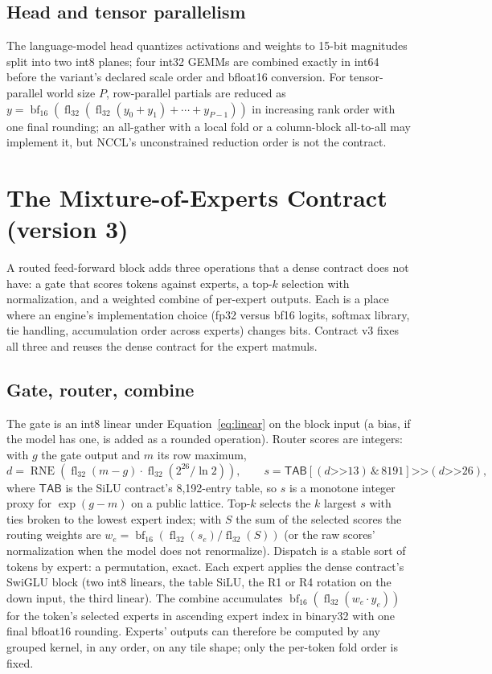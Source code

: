 \documentclass{article}
\newcommand{\fl}{\operatorname{fl}_{32}}
\newcommand{\bfround}{\operatorname{bf}_{16}}
\newcommand{\rne}{\operatorname{RNE}}
\begin{document}
\subsection{Head and tensor parallelism}

The language-model head quantizes activations and weights to 15-bit magnitudes split into two
int8 planes; four int32 GEMMs are combined exactly in int64 before the variant's declared
scale order and bfloat16 conversion.  For tensor-parallel world size $P$, row-parallel
partials are reduced as $y=\bfround(\fl(\fl(y_0+y_1)+\cdots+y_{P-1}))$ in increasing rank
order with one final rounding; an all-gather with a local fold or a column-block all-to-all
may implement it, but NCCL's unconstrained reduction order is not the contract.

\section{The Mixture-of-Experts Contract (version 3)}
\label{sec:moe}

A routed feed-forward block adds three operations that a dense contract does not have: a
gate that scores tokens against experts, a top-$k$ selection with normalization, and a
weighted combine of per-expert outputs.  Each is a place where an engine's implementation
choice (fp32 versus bf16 logits, softmax library, tie handling, accumulation order across
experts) changes bits.  Contract v3 fixes all three and reuses the dense contract for the
expert matmuls.

\subsection{Gate, router, combine}

The gate is an int8 linear under Equation~\eqref{eq:linear} on the block input (a bias, if
the model has one, is added as a rounded operation).  Router scores are integers: with $g$
the gate output and $m$ its row maximum,
\begin{equation}
  d=\rne\!\left(\fl(m-g)\cdot\fl(2^{26}/\ln 2)\right),\qquad
  s=\mathsf{TAB}[(d\mathbin{\texttt{>>}}13)\,\&\,8191]\mathbin{\texttt{>>}}(d\mathbin{\texttt{>>}}26),
\end{equation}
where $\mathsf{TAB}$ is the SiLU contract's 8,192-entry table, so $s$ is a monotone integer
proxy for $\exp(g-m)$ on a public lattice.  Top-$k$ selects the $k$ largest $s$ with ties
broken to the lowest expert index; with $S$ the sum of the selected scores the routing
weights are $w_e=\bfround(\fl(s_e)/\fl(S))$ (or the raw scores' normalization when the model
does not renormalize).  Dispatch is a stable sort of tokens by expert: a permutation, exact.
Each expert applies the dense contract's SwiGLU block (two int8 linears, the table SiLU, the
R1 or R4 rotation on the down input, the third linear).  The combine accumulates
$\bfround(\fl(w_e\cdot y_e))$ for the token's selected experts in ascending expert index in
binary32 with one final bfloat16 rounding.  Experts' outputs can therefore be computed by any
grouped kernel, in any order, on any tile shape; only the per-token fold order is fixed.
\end{document}
